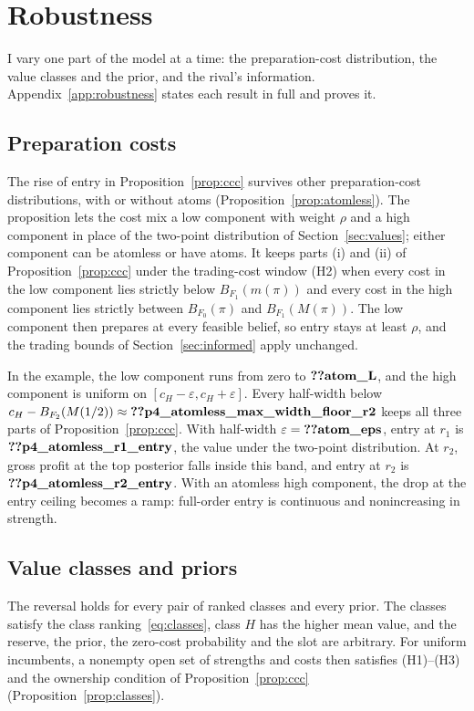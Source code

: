 \section{Robustness}\label{sec:robustness}

I vary one part of the model at a time: the preparation-cost distribution, the value classes and the prior, and the
rival's information. Appendix~\ref{app:robustness} states each result in full and proves
it.

\subsection{Preparation costs}\label{sec:costs}

The rise of entry in Proposition~\ref{prop:ccc} survives other preparation-cost distributions, with or without atoms
(Proposition~\ref{prop:atomless}). The proposition lets the cost mix a low component with weight \(\rho\) and a
high component in place of the two-point distribution of Section~\ref{sec:values}; either component can be atomless or have
atoms. It keeps parts (i) and (ii) of Proposition~\ref{prop:ccc} under the trading-cost window (H2)
when every cost in the low component lies strictly below \(B_{F_1}(m(\pi))\) and every cost in the high component
lies strictly between \(B_{F_0}(\pi)\) and \(B_{F_1}(M(\pi))\). The low component then prepares at every feasible
belief, so entry stays at least \(\rho\), and the trading bounds of Section~\ref{sec:informed} apply unchanged.

In the example, the low component runs from zero to \(\reg{atom_L}\), and the high component is uniform on
\([c_H-\varepsilon,c_H+\varepsilon]\). Every half-width below
\(c_H-B_{F_2}(M(1/2))\approx\reg{p4_atomless_max_width_floor_r2}\) keeps all three parts of
Proposition~\ref{prop:ccc}. With half-width \(\varepsilon=\reg{atom_eps}\), entry at \(r_1\) is
\(\reg{p4_atomless_r1_entry}\), the value under the two-point distribution. At \(r_2\), gross profit at the top posterior falls
inside this band, and entry at \(r_2\) is \(\reg{p4_atomless_r2_entry}\). With an atomless high component, the drop
at the entry ceiling becomes a ramp: full-order entry is continuous and nonincreasing in strength.

\subsection{Value classes and priors}\label{sec:classes}

The reversal holds for every pair of ranked classes and every prior. The classes satisfy the class
ranking~\eqref{eq:classes}, class \(H\) has the higher mean value, and the reserve, the prior, the zero-cost probability and the
slot are arbitrary. For uniform incumbents, a nonempty open set of strengths and costs then satisfies (H1)--(H3)
and the ownership condition of Proposition~\ref{prop:ccc} (Proposition~\ref{prop:classes}).


